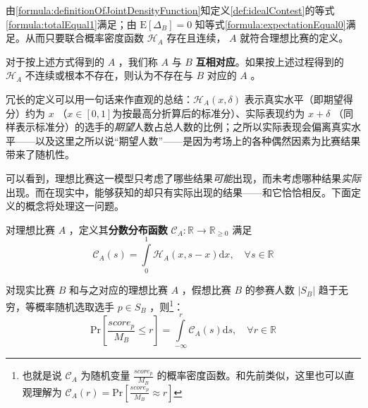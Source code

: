 \begin{definition}
\begin{asparaenum}[\bfseries{步骤} 1.]
                \end{asparaenum}

                由\eqref{formula:definitionOfJointDensityFunction}知定义\ref{def:idealContest}的等式\eqref{formula:totalEqual1}满足；由 $\mathrm{E}\left[\Delta_B\right]=0$ 知等式\eqref{formula:expectationEqual0}满足。从而只要联合概率密度函数 $\mathcal{H}_A$ 存在且连续， $A$ 就符合理想比赛的定义。

                对于按上述方式得到的 $A$ ，我们称 $A$ 与 $B$ \textbf{互相对应}。如果按上述过程得到的 $\mathcal{H}_A$ 不连续或根本不存在，则认为不存在与 $B$ 对应的 $A$ 。
                
                \label{def:realIdealCorrespondence}
            \end{definition}

            冗长的定义可以用一句话来作直观的总结：$\mathcal{H}_A\left(x,\delta\right)$ 表示真实水平（即期望得分）约为 $x$ （$x\in\left[0,1\right]$为按最高分折算后的标准分）、实际表现约为 $x+\delta$ （同样表示标准分）的选手的\emph{期望}人数占总人数的比例；之所以实际表现会偏离真实水平——以及这里之所以说“期望人数”——是因为考场上的各种偶然因素为比赛结果带来了随机性。

            可以看到，理想比赛这一模型只考虑了哪些结果\emph{可能}出现，而未考虑哪种结果\emph{实际}出现。而在现实中，能够获知的却只有实际出现的结果——和它恰恰相反。下面定义的概念将处理这一问题。

            \begin{definition}[分数分布函数]
                对理想比赛 $A$ ，定义其\textbf{分数分布函数} $\mathcal{C}_A:\mathbb{R}\to\mathbb{R}_{\geq 0}$ 满足
                $$
                \mathcal{C}_A(s)=\int\limits_{0}^1 \mathcal{H}_A(x,s-x) \mathrm{d}x,\quad\forall s\in\mathbb{R}
                $$

                \label{def:scoreDistribution}
            \end{definition}

            \begin{proposition}[分数分布函数的实际含义]
                对现实比赛 $B$ 和与之对应的理想比赛 $A$ ，假想比赛 $B$ 的参赛人数 $|S_B|$ 趋于无穷，等概率随机选取选手 $p\in S_B$ ，则\footnote{也就是说 $\mathcal{C}_A$ 为随机变量 $\frac{\textit{score}_p}{M_B}$ 的概率密度函数。和先前类似，这里也可以直观理解为 $\mathcal{C}_A(r)=\mathrm{Pr}\left[\frac{\textit{score}_p}{M_B}\approx r\right]$ }：
                $$
                \mathrm{Pr}\left[\frac{\textit{score}_p}{M_B}\leq r\right]=\int\limits_{-\infty}^r \mathcal{C}_A(s)\mathrm{d}s,\quad\forall r\in\mathbb{R}
                $$

                \label{prop:scoreDistributionMeaning}
            \end{proposition}

